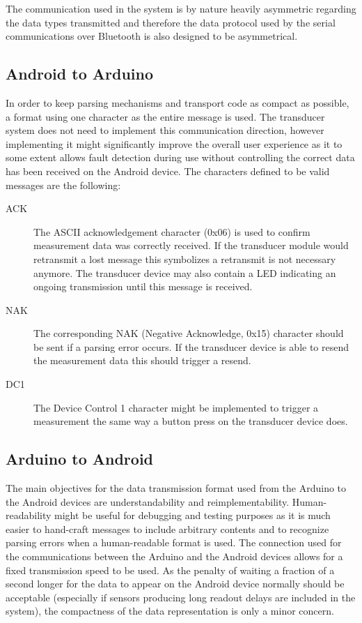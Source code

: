The communication used in the system is by nature heavily asymmetric regarding the data types transmitted and therefore the data protocol used by the serial communications over Bluetooth is also designed to be asymmetrical. 

\subsection{Android to Arduino}
In order to keep parsing mechanisms and transport code as compact as possible, a format using one character as the entire message is used. The transducer system does not need to implement this communication direction, however implementing it might significantly improve the overall user experience as it to some extent allows fault detection during use without controlling the correct data has been received on the Android device. The characters defined to be valid messages are the following:

\begin{description}
	\item [ACK] The ASCII acknowledgement character (0x06) is used to confirm measurement data was correctly received. If the transducer module would retransmit a lost message this symbolizes a retransmit is not necessary anymore. The transducer device may also contain a LED indicating an ongoing transmission until this message is received.
	\item [NAK] The corresponding NAK (Negative Acknowledge, 0x15) character should be sent if a parsing error occurs. If the transducer device is able to resend the measurement data this should trigger a resend.
	\item [DC1] The Device Control 1 character might be implemented to trigger a measurement the same way a button press on the transducer device does.
\end{description}

\subsection{Arduino to Android}
The main objectives for the data transmission format used from the Arduino to the Android devices are understandability and reimplementability.  Human-readability might be useful for debugging and testing purposes as it is much easier to hand-craft messages to include arbitrary contents and to recognize parsing errors when a human-readable format is used. The connection used for the communications between the Arduino and the Android devices allows for a fixed transmission speed to be used. As the penalty of waiting a fraction of a second longer for the data to appear on the Android device normally should be acceptable (especially if sensors producing long readout delays are included in the system), the compactness of the data representation is only a minor concern.

